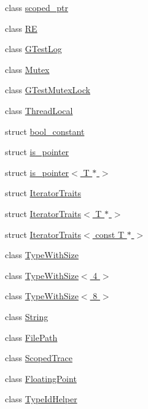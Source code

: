 \begin{DoxyCompactItemize}
class \hyperlink{classtesting_1_1internal_1_1scoped__ptr}{scoped\-\_\-ptr}
\item 
class \hyperlink{classtesting_1_1internal_1_1RE}{\-R\-E}
\item 
class \hyperlink{classtesting_1_1internal_1_1GTestLog}{\-G\-Test\-Log}
\item 
class \hyperlink{classtesting_1_1internal_1_1Mutex}{\-Mutex}
\item 
class \hyperlink{classtesting_1_1internal_1_1GTestMutexLock}{\-G\-Test\-Mutex\-Lock}
\item 
class \hyperlink{classtesting_1_1internal_1_1ThreadLocal}{\-Thread\-Local}
\item 
struct \hyperlink{structtesting_1_1internal_1_1bool__constant}{bool\-\_\-constant}
\item 
struct \hyperlink{structtesting_1_1internal_1_1is__pointer}{is\-\_\-pointer}
\item 
struct \hyperlink{structtesting_1_1internal_1_1is__pointer_3_01T_01_5_01_4}{is\-\_\-pointer$<$ T $\ast$ $>$}
\item 
struct \hyperlink{structtesting_1_1internal_1_1IteratorTraits}{\-Iterator\-Traits}
\item 
struct \hyperlink{structtesting_1_1internal_1_1IteratorTraits_3_01T_01_5_01_4}{\-Iterator\-Traits$<$ T $\ast$ $>$}
\item 
struct \hyperlink{structtesting_1_1internal_1_1IteratorTraits_3_01const_01T_01_5_01_4}{\-Iterator\-Traits$<$ const T $\ast$ $>$}
\item 
class \hyperlink{classtesting_1_1internal_1_1TypeWithSize}{\-Type\-With\-Size}
\item 
class \hyperlink{classtesting_1_1internal_1_1TypeWithSize_3_014_01_4}{\-Type\-With\-Size$<$ 4 $>$}
\item 
class \hyperlink{classtesting_1_1internal_1_1TypeWithSize_3_018_01_4}{\-Type\-With\-Size$<$ 8 $>$}
\item 
class \hyperlink{classtesting_1_1internal_1_1String}{\-String}
\item 
class \hyperlink{classtesting_1_1internal_1_1FilePath}{\-File\-Path}
\item 
class \hyperlink{classtesting_1_1internal_1_1ScopedTrace}{\-Scoped\-Trace}
\item 
class \hyperlink{classtesting_1_1internal_1_1FloatingPoint}{\-Floating\-Point}
\item 
class \hyperlink{classtesting_1_1internal_1_1TypeIdHelper}{\-Type\-Id\-Helper}
\item 

\end{DoxyCompactItemize}
